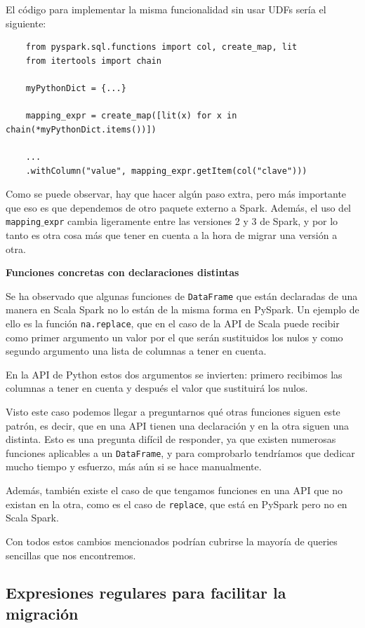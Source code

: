 \documentclass[12pt,twoside,titlepage]{report}
\begin{document}
El código para implementar la misma funcionalidad sin usar UDFs sería el siguiente:

\begin{lstlisting}
	from pyspark.sql.functions import col, create_map, lit
	from itertools import chain
	
	myPythonDict = {...}
	
	mapping_expr = create_map([lit(x) for x in chain(*myPythonDict.items())])
	
	...
	.withColumn("value", mapping_expr.getItem(col("clave")))
\end{lstlisting}

Como se puede observar, hay que hacer algún paso extra, pero más importante que eso es que dependemos de otro paquete externo a Spark. Además, el uso del \texttt{mapping$\_$expr} cambia ligeramente entre las versiones 2 y 3 de Spark, y por lo tanto es otra cosa más que tener en cuenta a la hora de migrar una versión a otra.

\textbf{Funciones concretas con declaraciones distintas}

Se ha observado que algunas funciones de \texttt{DataFrame} que están declaradas de una manera en Scala Spark no lo están de la misma forma en PySpark. Un ejemplo de ello es la función \texttt{na.replace}, que en el caso de la API de Scala puede recibir como primer argumento un valor por el que serán sustituidos los nulos y como segundo argumento una lista de columnas a tener en cuenta.

En la API de Python estos dos argumentos se invierten: primero recibimos las columnas a tener en cuenta y después el valor que sustituirá los nulos.

Visto este caso podemos llegar a preguntarnos qué otras funciones siguen este patrón, es decir, que en una API tienen una declaración y en la otra siguen una distinta. Esto es una pregunta difícil de responder, ya que existen numerosas funciones aplicables a un \texttt{DataFrame}, y para comprobarlo tendríamos que dedicar mucho tiempo y esfuerzo, más aún si se hace manualmente.

Además, también existe el caso de que tengamos funciones en una API que no existan en la otra, como es el caso de \texttt{replace}, que está en PySpark pero no en Scala Spark.

Con todos estos cambios mencionados podrían cubrirse la mayoría de queries sencillas que nos encontremos.

\subsection{Expresiones regulares para facilitar la migración}
\end{document}

